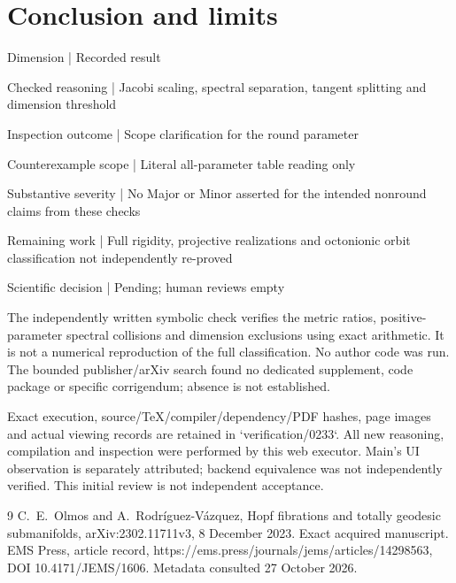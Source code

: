 \documentclass[10pt]{article}
\begin{document}
\section*{Conclusion and limits}
Dimension | Recorded result\par
Checked reasoning | Jacobi scaling, spectral separation, tangent splitting and dimension threshold\par
Inspection outcome | Scope clarification for the round parameter\par
Counterexample scope | Literal all-parameter table reading only\par
Substantive severity | No Major or Minor asserted for the intended nonround claims from these checks\par
Remaining work | Full rigidity, projective realizations and octonionic orbit classification not independently re-proved\par
Scientific decision | Pending; human reviews empty\par
The independently written symbolic check verifies the metric ratios, positive-parameter spectral collisions and dimension exclusions using exact arithmetic. It is not a numerical reproduction of the full classification. No author code was run. The bounded publisher/arXiv search found no dedicated supplement, code package or specific corrigendum; absence is not established.\par
Exact execution, source/TeX/compiler/dependency/PDF hashes, page images and actual viewing records are retained in `verification/0233`. All new reasoning, compilation and inspection were performed by this web executor. Main’s UI observation is separately attributed; backend equivalence was not independently verified. This initial review is not independent acceptance.\par
9 C. E. Olmos and A. Rodríguez-Vázquez, Hopf fibrations and totally geodesic submanifolds, arXiv:2302.11711v3, 8 December 2023. Exact acquired manuscript. EMS Press, article record, https://ems.press/journals/jems/articles/14298563, DOI 10.4171/JEMS/1606. Metadata consulted 27 October 2026.\par
\end{document}
